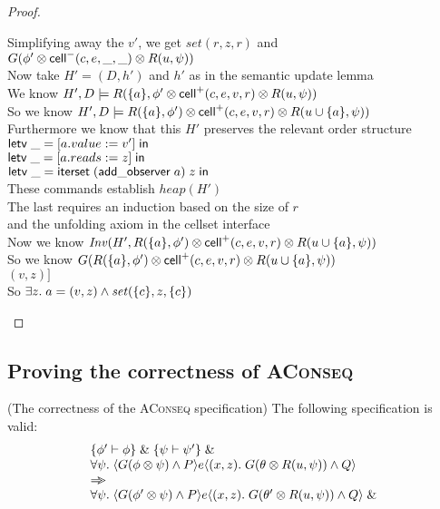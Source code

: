 \begin{proof}
\begin{tabbedproof}
\ooo Simplifying away the $v'$, we get $\mathit{set}(r, z, r)$ and $G(\phi' \otimes \mathsf{cell}^{-}({c}, {e}, {\_}, {\_}) \otimes R(u, \psi))$ \\
\ooo Now take $H' = (D,h')$ and $h'$ as in the semantic update lemma \\
\ooo We know $H', D \models R(\{{a}\}, \phi' \otimes \mathsf{cell}^{+}({c}, {e}, {v}, {r}) \otimes R(u, \psi))$\\
\ooo So we know $H', D \models R(\{{a}\}, \phi') \otimes \mathsf{cell}^{+}({c}, {e}, {v}, {r}) \otimes R(u \cup \{{a}\}, \psi))$ \\
\ooo Furthermore we know that this $H'$ preserves the relevant order structure \\
\ooo $\mathsf{letv}\;\_ = [a.value := v']\;\mathsf{in}\;$ \\
\ooo $\mathsf{letv}\;\_ = [a.reads := z]\;\mathsf{in}\;$ \\
\ooo $\mathsf{letv}\;\_ = \mathsf{iterset}\;(\mathsf{add\_observer}\;a)\;z\;\mathsf{in}\;$ \\
\ooo These commands establish $\mathit{heap}(H')$ \\
\ooo The last requires an induction based on the size of $r$ \\ 
\oox and the unfolding axiom in the cellset interface \\
\ooo Now we know $\mathit{Inv}(H', R(\{{a}\}, \phi') \otimes \mathsf{cell}^{+}({c}, {e}, {v}, {r}) \otimes R(u \cup \{{a}\}, \psi))$ \\
\ooo So we know $G(R(\{{a}\}, \phi') \otimes \mathsf{cell}^{+}({c}, {e}, {v}, {r}) \otimes R(u \cup \{{a}\}, \psi))$ \\
\ooo $(v, z)]$ \\
\ooo So $\exists z.\;a = (v,z) \land \mathit{set}(\{{c}\}, z, \{{c}\})$ 
\end{tabbedproof}
\end{proof}

\subsection{Proving the correctness of \textsc{AConseq}}

\begin{prop*}{(The correctness of the \textsc{AConseq} specification)}
The following specification is valid:
\begin{displaymath}
\begin{array}{l}
\{{\phi' \vdash \phi}\} \;\&\; \{{\psi \vdash \psi'}\} \;\&\; \\
\forall \psi.\; \langle{G(\phi \otimes \psi) \land P}\rangle{e}\langle{(x,z)}.\;{G(\theta\otimes R(u, \psi)) \land Q}\rangle \\
\Rightarrow\!\!\!> \\
\forall \psi.\; \langle{G(\phi' \otimes \psi) \land P}\rangle{e}\langle{(x,z)}.\;{G(\theta'\otimes R(u, \psi)) \land Q}\rangle \;\&\; \\
\end{array}
\end{displaymath}
\end{prop*}

